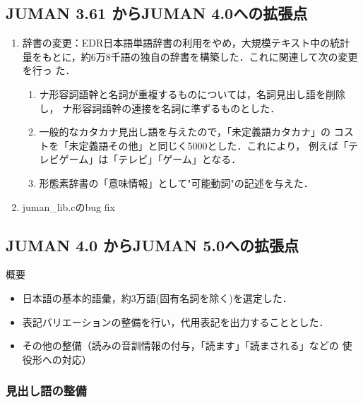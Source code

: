 \documentclass[a4j,titlepage]{jarticle}
\begin{document}
\subsection{JUMAN 3.61 からJUMAN 4.0への拡張点}

\begin{enumerate}

\item 辞書の変更：EDR日本語単語辞書の利用をやめ，大規模テキスト中の統計
量をもとに，約6万8千語の独自の辞書を構築した．これに関連して次の変更を行っ
た．

\begin{enumerate}
\item ナ形容詞語幹と名詞が重複するものについては，名詞見出し語を削除し，
      ナ形容詞語幹の連接を名詞に準ずるものとした．
\item 一般的なカタカナ見出し語を与えたので，「未定義語カタカナ」の
      コストを「未定義語その他」と同じく5000とした．これにより，
      例えば「テレビゲーム」は「テレビ」「ゲーム」となる．
\item 形態素辞書の「意味情報」として"可能動詞"の記述を与えた．
\end{enumerate}

\item juman\_lib.cのbug fix
\end{enumerate}

\subsection{JUMAN 4.0 からJUMAN 5.0への拡張点}
\label{subsec:5.0}

概要
\begin{itemize}
 \item 日本語の基本的語彙，約3万語(固有名詞を除く)を選定した．
 \item 表記バリエーションの整備を行い，代用表記を出力することとした．
 \item その他の整備（読みの音訓情報の付与，「読ます」「読まされる」などの
  使役形への対応）
\end{itemize}

\subsubsection{見出し語の整備}
\end{document}
